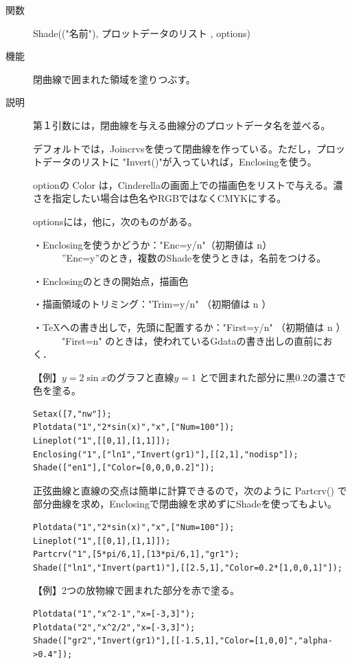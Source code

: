 \documentclass[papersize,a4paper,12pt,uplatex]{jsarticle}
\begin{document}
\begin{description}
\vspace{\baselineskip}
\hypertarget{shade}{}
\item[関数]Shade(("名前"), プロットデータのリスト , options)
\item[機能]閉曲線で囲まれた領域を塗りつぶす。
\item[説明]第１引数には，閉曲線を与える曲線分のプロットデータ名を並べる。

デフォルトでは，Joincrvsを使って閉曲線を作っている。ただし，プロットデータのリストに
"Invert()"が入っていれば，Enclosingを使う。

optionの Color は，Cinderellaの画面上での描画色をリストで与える。濃さを指定したい場合は色名やRGBではなくCMYKにする。

optionsには，他に，次のものがある。

・Enclosingを使うかどうか："Enc=y/n"（初期値は n）\\
　　　''Enc=y''のとき，複数のShadeを使うときは，名前をつける。

・Enclosingのときの開始点，描画色

・描画領域のトリミング："Trim=y/n" （初期値は n ）

・TeXへの書き出しで，先頭に配置するか："First=y/n" （初期値は n ）\\
　　　"First=n" のときは，使われているGdataの書き出しの直前におく．


\vspace{\baselineskip}
【例】$y=2\sin x$のグラフと直線$y=1$ とで囲まれた部分に黒0.2の濃さで色を塗る。
\begin{verbatim}
Setax([7,"nw"]);
Plotdata("1","2*sin(x)","x",["Num=100"]);
Lineplot("1",[[0,1],[1,1]]);
Enclosing("1",["ln1","Invert(gr1)"],[[2,1],"nodisp"]);
Shade(["en1"],["Color=[0,0,0,0.2]"]);
\end{verbatim}
\begin{center}  \end{center}

正弦曲線と直線の交点は簡単に計算できるので，次のように Partcrv() で部分曲線を求め，Enclosingで閉曲線を求めずにShadeを使ってもよい。
\begin{verbatim}
Plotdata("1","2*sin(x)","x",["Num=100"]);
Lineplot("1",[[0,1],[1,1]]);
Partcrv("1",[5*pi/6,1],[13*pi/6,1],"gr1");
Shade(["ln1","Invert(part1)"],[[2.5,1],"Color=0.2*[1,0,0,1]"]);
\end{verbatim}


\vspace{\baselineskip}
【例】2つの放物線で囲まれた部分を赤で塗る。
\begin{verbatim}
Plotdata("1","x^2-1","x=[-3,3]");
Plotdata("2","x^2/2","x=[-3,3]");
Shade(["gr2","Invert(gr1)"],[[-1.5,1],"Color=[1,0,0]","alpha->0.4"]);
\end{verbatim}


\end{description}
\end{document}
